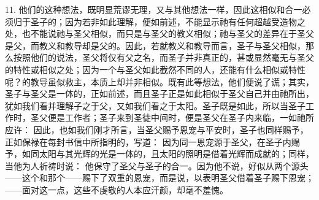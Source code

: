 11. 他们的这种想法，既明显荒谬无理，又与其他想法一样，因此这相似和合一必须归于圣子的；因为若非如此理解，便如前述，不能显示祂有任何超越受造物之处，也不能说祂与圣父相似，而只是与圣父的教义相似；祂与圣父的差异在于圣父是父，而教义和教导却是父的。因此，若就教义和教导而言，圣子与圣父相似，那么按照他们的说法，圣父将仅有父之名，而圣子并非真正的，甚或显然毫无与圣父的特性或相似之处；因为一个与圣父如此截然不同的人，还能有什么相似或特性呢？的教导虽似救主，本质上却并非相似。既有此等想法，他们便说了谎；其实，圣子与圣父是一体的，正如前述，而且圣子正是如此相似于圣父自己并由祂所出，犹如我们看并理解子之于父，又如我们看之于太阳。圣子既是如此，所以当圣子工作时，圣父便是工作者；圣子来到圣徒中间时，便是圣父在圣子内来临，一如祂所应许： 因此，也如我们刚才所言，当圣父赐予恩宠与平安时，圣子也同样赐予，正如保禄在每封书信中所指明的，写道： 因为同一恩宠源于圣父，在圣子内赐予，如同太阳与其光辉的光是一体的，且太阳的照明是借着光辉而成就的；同样，当他为人祈祷时说： 他保守了圣父与圣子的合一。因为他不说，好似从两个源头——这个和那个——赐下了双重的恩宠，而是说，以表明圣父借着圣子赐下恩宠；——面对这一点，这些不虔敬的人本应汗颜，却毫不羞愧。\par

